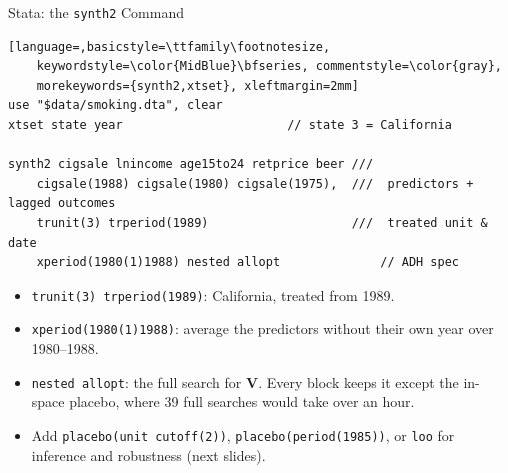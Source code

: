 \documentclass[main.tex]{subfiles}
\begin{document}
\begin{frame}[fragile]{Stata: the \texttt{synth2} Command}

\begin{lstlisting}[language=,basicstyle=\ttfamily\footnotesize,
    keywordstyle=\color{MidBlue}\bfseries, commentstyle=\color{gray},
    morekeywords={synth2,xtset}, xleftmargin=2mm]
use "$data/smoking.dta", clear
xtset state year                       // state 3 = California

synth2 cigsale lnincome age15to24 retprice beer ///
    cigsale(1988) cigsale(1980) cigsale(1975),  ///  predictors + lagged outcomes
    trunit(3) trperiod(1989)                    ///  treated unit & date
    xperiod(1980(1)1988) nested allopt              // ADH spec
\end{lstlisting}

  \footnotesize
  \begin{itemize}\footnotesize
    \item \texttt{trunit(3) trperiod(1989)}: California, treated from 1989.
    \item \texttt{xperiod(1980(1)1988)}: average the predictors without their own
      year over 1980--1988.
    \item \texttt{nested allopt}: the full search for $\mathbf{V}$. Every block
      keeps it except the in-space placebo, where 39 full searches would take
      over an hour.
    \item Add \texttt{placebo(unit cutoff(2))}, \texttt{placebo(period(1985))},
      or \texttt{loo} for inference and robustness (next slides).
  \end{itemize}

\end{frame}
\end{document}
